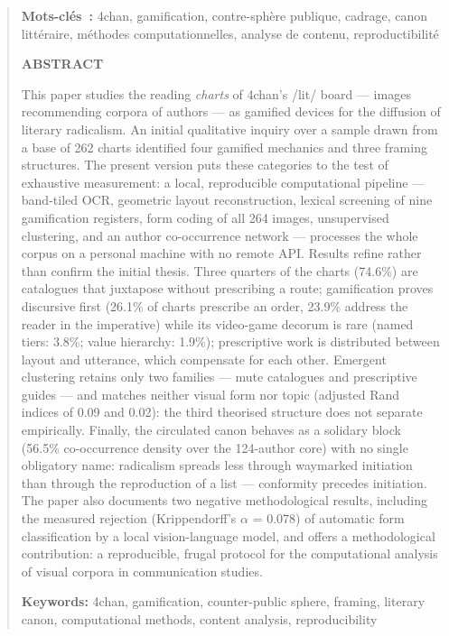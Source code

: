 \documentclass[11pt,a4paper]{article}
\begin{document}
\begin{quote}
\textbf{Mots-clés~:} 4chan, gamification, contre-sphère publique, cadrage, canon littéraire, méthodes computationnelles, analyse de contenu, reproductibilité\par\bigskip
{\sffamily\footnotesize\bfseries ABSTRACT}\par\smallskip
This paper studies the reading \emph{charts} of 4chan's /lit/ board --- images recommending corpora of authors --- as gamified devices for the diffusion of literary radicalism. An initial qualitative inquiry over a sample drawn from a base of 262 charts identified four gamified mechanics and three framing structures. The present version puts these categories to the test of exhaustive measurement: a local, reproducible computational pipeline --- band-tiled OCR, geometric layout reconstruction, lexical screening of nine gamification registers, form coding of all 264 images, unsupervised clustering, and an author co-occurrence network --- processes the whole corpus on a personal machine with no remote API. Results refine rather than confirm the initial thesis. Three quarters of the charts (74.6\%) are catalogues that juxtapose without prescribing a route; gamification proves discursive first (26.1\% of charts prescribe an order, 23.9\% address the reader in the imperative) while its video-game decorum is rare (named tiers: 3.8\%; value hierarchy: 1.9\%); prescriptive work is distributed between layout and utterance, which compensate for each other. Emergent clustering retains only two families --- mute catalogues and prescriptive guides --- and matches neither visual form nor topic (adjusted Rand indices of 0.09 and 0.02): the third theorised structure does not separate empirically. Finally, the circulated canon behaves as a solidary block (56.5\% co-occurrence density over the 124-author core) with no single obligatory name: radicalism spreads less through waymarked initiation than through the reproduction of a list --- conformity precedes initiation. The paper also documents two negative methodological results, including the measured rejection (Krippendorff's $\alpha$ = 0.078) of automatic form classification by a local vision-language model, and offers a methodological contribution: a reproducible, frugal protocol for the computational analysis of visual corpora in communication studies.\par\smallskip
\textbf{Keywords:} 4chan, gamification, counter-public sphere, framing, literary canon, computational methods, content analysis, reproducibility
\end{quote}
\vspace{1em}
\end{document}
